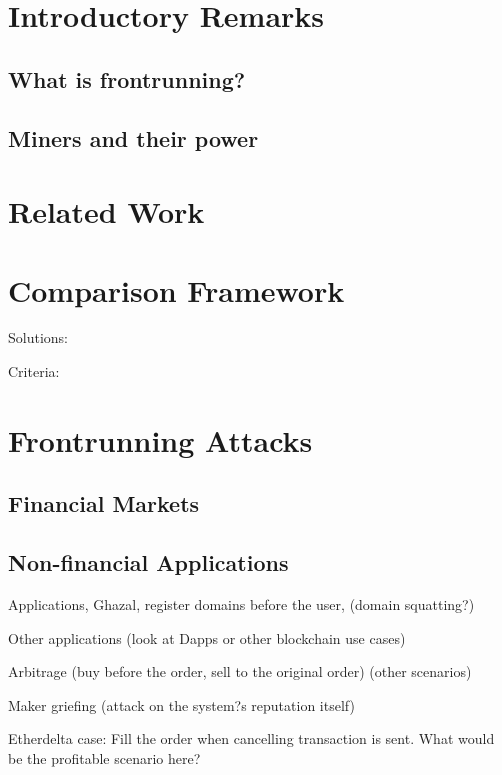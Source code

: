 \section{Introductory Remarks}

\subsection{What is frontrunning?} %
\subsection{Miners and their power} 


\section{Related Work}



\section{Comparison Framework}

Solutions: \par\noindent
Criteria:




\section{Frontrunning Attacks}

\subsection{Financial Markets}

\subsection{Non-financial Applications}
Applications, Ghazal, register domains before the user, (domain squatting?) \par\noindent
Other applications (look at Dapps or other blockchain use cases)\par\noindent
Arbitrage (buy before the order, sell to the original order) (other scenarios)\par\noindent
Maker griefing (attack on the system?s reputation itself)\par\noindent
Etherdelta case: Fill the order when cancelling transaction is sent. What would be the profitable scenario here?


